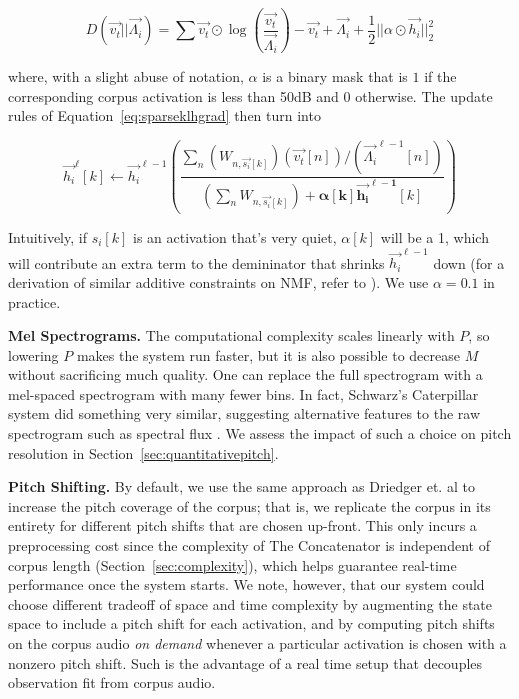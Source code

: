 \documentclass{article}
\begin{document}
\begin{equation}
    \label{eq:klloss}
    D(\vec{v_t} || \vec{\Lambda_i}) = \sum \vec{v_t} \odot \log \left( \frac{\vec{v_t}}{\vec{\Lambda_i}} \right) - \vec{v_t} + \vec{\Lambda_i} + \frac{1}{2} ||\alpha \odot \vec{h_i}||_2^2
    \end{equation}

where, with a slight abuse of notation, $\alpha$ is a binary mask that is $1$ if the corresponding corpus activation is less than 50dB and $0$ otherwise.  The update rules of Equation~\ref{eq:sparseklhgrad} then turn into 

\begin{equation}
    \label{eq:sparseklhgrad}
    \vec{h_i}^{\ell}[k]  \gets \vec{h_i}^{\ell-1} \left(  \frac{\sum_n (W_{n, \vec{s_i}[k]}) (\vec{v_t}[n]) / (\vec{\Lambda_i}^{\ell-1}[n]) }{ (\sum_{n} W_{n, \vec{s_i}[k]}) + \boldsymbol{ \alpha[k] \vec{h_i}^{\ell-1}}[k]} \right)
\end{equation}

Intuitively, if $s_i[k]$ is an activation that's very quiet, $\alpha[k]$ will be a 1, which will contribute an extra term to the demininator that shrinks $\vec{h_i}^{\ell-1}$ down (for a derivation of similar additive constraints on NMF, refer to \cite{virtanen2007monaural}).  We use $\alpha=0.1$ in practice.


\textbf{Mel Spectrograms.} The computational complexity scales linearly with $P$, so lowering $P$ makes the system run faster, but it is also possible to decrease $M$ without sacrificing much quality.  One can replace the full spectrogram with a mel-spaced spectrogram with many fewer bins.  In fact, Schwarz's Caterpillar system did something very similar, suggesting alternative features to the raw spectrogram such as spectral flux \cite{schwarz2000system}.  We assess the impact of such a choice on pitch resolution in Section~\ref{sec:quantitativepitch}.


\textbf{Pitch Shifting.} By default, we use the same approach as Driedger et. al to increase the pitch coverage of the corpus; that is, we replicate the corpus in its entirety for different pitch shifts that are chosen up-front.  This only incurs a preprocessing cost since the complexity of The Concatenator is independent of corpus length (Section~\ref{sec:complexity}), which helps guarantee real-time performance once the system starts.  We note, however, that our system could choose different tradeoff of space and time complexity by augmenting the state space to include a pitch shift for each activation, and by computing pitch shifts on the corpus audio {\em on demand} whenever a particular activation is chosen with a nonzero pitch shift.  Such is the advantage of a real time setup that decouples observation fit from corpus audio.
\end{document}
